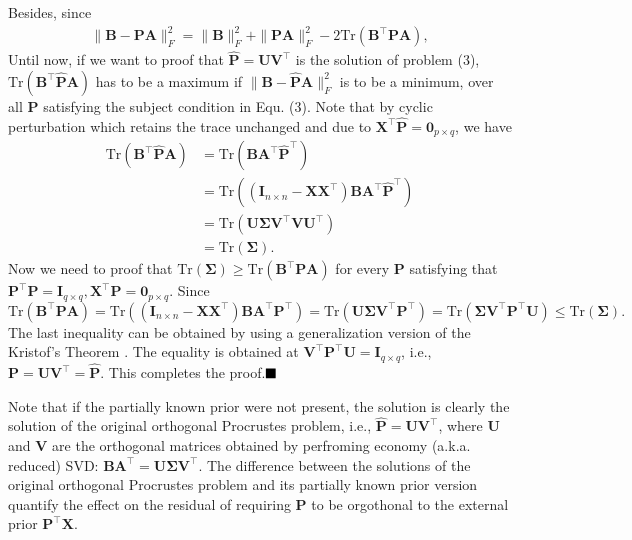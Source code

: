 \documentclass[titlepage,11pt,twoside]{article}
\begin{document}
Besides, since
\begin{equation}
\begin{split}
\|\mathbf{B}-\mathbf{P}\mathbf{A}\|_{F}^{2}
=\|\mathbf{B}\|_{F}^{2}+\|\mathbf{P}\mathbf{A}\|_{F}^{2}-2\text{Tr}(\mathbf{B}^{\top}\mathbf{P}\mathbf{A}),
\end{split}
\end{equation}
Until now, if we want to proof that $\mathbf{\hat{P}}=\mathbf{U}\mathbf{V}^{\top}$ is the solution of problem (3), $\text{Tr}(\mathbf{B}^{\top}\mathbf{\hat{P}}\mathbf{A})$ has to be a maximum if $\|\mathbf{B}-\mathbf{\hat{P}}\mathbf{A}\|_{F}^{2}$ is to be a minimum, over all $\mathbf{P}$ satisfying the subject condition in Equ. (3).
Note that by cyclic perturbation which retains the trace unchanged and due to $\mathbf{X}^{\top}\mathbf{\hat{P}}=\mathbf{0}_{p\times q}$, we have 
\begin{equation}
\begin{split}
\text{Tr}(\mathbf{B}^{\top}\mathbf{\hat{P}}\mathbf{A})
&
=
\text{Tr}(\mathbf{B}\mathbf{A}^{\top}\mathbf{\hat{P}}^{\top})
\\
&
=
\text{Tr}((\mathbf{I}_{n\times n}-\mathbf{X}\mathbf{X}^{\top})\mathbf{B}\mathbf{A}^{\top}\mathbf{\hat{P}}^{\top})
\\
&
=
\text{Tr}(\mathbf{U}\mathbf{\Sigma}\mathbf{V}^{\top}\mathbf{V}\mathbf{U}^{\top})
\\
&
=
\text{Tr}(\mathbf{\Sigma}).
\end{split}
\end{equation}
Now we need to proof that $\text{Tr}(\mathbf{\Sigma})\ge\text{Tr}(\mathbf{B}^{\top}\mathbf{P}\mathbf{A})$ for every $\mathbf{P}$ satisfying that $\mathbf{P}^{\top}\mathbf{P} = \mathbf{I}_{q\times q}, \mathbf{X}^{\top}\mathbf{P} = \mathbf{0}_{p\times q}$. 
Since $\text{Tr}(\mathbf{B}^{\top}\mathbf{P}\mathbf{A})
=
\text{Tr}((\mathbf{I}_{n\times n}-\mathbf{X}\mathbf{X}^{\top})\mathbf{B}\mathbf{A}^{\top}\mathbf{P}^{\top})
=
\text{Tr}(\mathbf{U}\mathbf{\Sigma}\mathbf{V}^{\top}\mathbf{P}^{\top})
=
\text{Tr}(\mathbf{\Sigma}\mathbf{V}^{\top}\mathbf{P}^{\top}\mathbf{U})
\le
\text{Tr}(\mathbf{\Sigma})
.
$
The last inequality can be obtained by using a generalization version \cite{TenBerge1983} of the Kristof's Theorem \cite{Kristof1970515}. The equality is obtained at 
$\mathbf{V}^{\top}\mathbf{P}^{\top}\mathbf{U}=\mathbf{I}_{q\times q}$, i.e., $\mathbf{P}=\mathbf{U}\mathbf{V}^{\top}=\mathbf{\hat{P}}$. This completes the proof.$\hfill\blacksquare$ 

Note that if the partially known prior were not present, the solution is clearly the solution of the original orthogonal Procrustes problem, i.e., $\mathbf{\hat{P}} = \mathbf{U}\mathbf{V}^{\top}$, where $\mathbf{U}$ and $\mathbf{V}$ are the orthogonal matrices obtained by perfroming economy (a.k.a. reduced) SVD:
$\mathbf{B}\mathbf{A}^{\top} = \mathbf{U}\mathbf{\mathbf{\Sigma}}\mathbf{V}^{\top}$. 
The difference between the solutions of the original orthogonal Procrustes problem and its partially known prior version quantify the effect on the residual of requiring $\mathbf{P}$ to be orgothonal to the external prior $\mathbf{P}^{\top}\mathbf{X}$.
\end{document}
